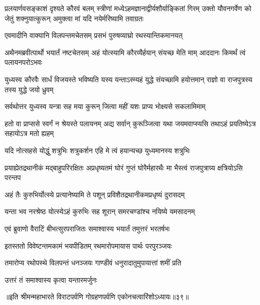 \onelineshloka
{प्रलयार्णवसङ्काशं दृश्यते कौरवं बलम्}
\threelineshloka
{स्त्रीणां मध्येऽहमज्ञानाद्वीर्यशौर्याङ्कितां गिरम्}
{उक्तो यौवनगर्वेण को जेतुं शक्नुयात्कुरून्}
{अमुक्त्वा मां यदि नयेर्मरिष्यामि तवाग्रतः}



\twolineshloka
{एवमादीनि वाक्यानि विलपन्तमचेतसम्}
{प्रसभं पुरुषव्याघ्रो रथस्यान्तिकमानयत्}


\onelineshloka
{अथैनमब्रवीत्पार्थो भयार्तं नष्टचेतसम्}
\twolineshloka
{अहं योत्स्यामि कौरव्यैर्हयान् संयच्छ मेति माम्}
{आददानः किमर्थं त्वं पलायनपरोऽभवः}


\threelineshloka
{युध्यस्व कौरवैः सार्धं विजयस्ते भविष्यति}
{यस्य यन्ताऽस्म्यहं युद्धे संयच्छामि हयोत्तमान्}
{राज्ञो वा राजपुत्रस्य तस्य युद्धे जयो ध्रुवम्}


\twolineshloka
{सर्वथोत्तर युध्यस्व यन्त्रा सह मया कुरून्}
{जित्वा महीं यशः प्राप्य भोक्ष्यसे सकलामिमाम्}


\onelineshloka
{हतो वा प्राप्ससे स्वर्गं न श्रेयस्ते पलायनम्}
\twolineshloka
{अद्य सर्वान् कुरूञ्जित्वा यथा जयमवाप्स्यसि}
{तथाऽहं प्रयतिष्येऽत्र सहायोऽत्र मतो ह्यहम्}


\twolineshloka
{यदि नोत्सहसे योद्धुं शत्रुभिः शत्रुकर्शन}
{एहि मे त्वं हयान्यच्छ युध्यमानस्य शत्रुभिः}


\threelineshloka
{प्रयाह्येतद्रथानीकं मद्बाहुपरिरक्षितः}
{अप्रधृष्यतमं घोरं गुप्तं घोरैर्महारथैः}
{मा भैस्त्वं राजपुत्राग्र्य क्षत्रियोऽसि परन्तप}


\twolineshloka
{अहं तैः कुरुभिर्योत्स्ये प्रत्यानेष्यामि ते पशून्}
{प्रविशैतद्रथानीकमप्रधृष्यं दुरासदम्}


\twolineshloka
{यन्ता भव नरश्रेष्ठ योत्स्येऽहं कुरुभिः सह}
{शूरान् समरचण्डांश्च नयिष्ये यमसादनम्}



\twolineshloka
{एवं ब्रुवाणो वैराटिं बीभत्सुरपराजितः}
{समाश्वास्य भयार्तं तमुत्तरं भरतर्षभः}


\twolineshloka
{इतस्ततो विवेष्टन्तमकामं भयपीडितम्}
{रथमारोपमायास पार्थः परपुरञ्जयः}


\twolineshloka
{तमारोप्य रथोपस्थे विलपन्तं धनञ्जयः}
{गाण्डीवं धनुरादातुमुपायात्तां शमीं प्रति}



\onelineshloka
{उत्तरं तं समाश्वास्य कृत्वा यन्तारमर्जुनः}


॥इति श्रीमन्महाभारते विराटपर्वणि गोग्रहणपर्वणि एकोनचत्वारिंशोऽध्यायः॥३९॥

